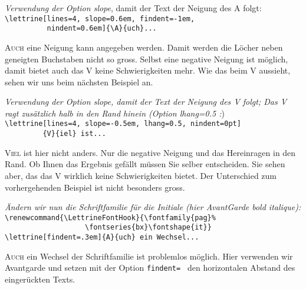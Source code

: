 \documentclass[12pt,a4paper]{article}
\begin{document}
\vspace{.5\baselineskip}
\textit{Verwendung der Option {\ttfamily\upshape slope}}, damit der Text
der Neigung des {\glqq}A{\grqq} folgt:\\
\verb+\lettrine[lines=4, slope=0.6em, findent=-1em,+\\
\verb+          nindent=0.6em]{\A}{uch}...+

\lettrine[lines=4, slope=0.6em, findent=-1em, nindent=0.6em]{A}{uch} eine
Neigung kann angegeben werden. Damit werden die L\"ocher neben geneigten
Buchstaben nicht so gross. Selbst eine negative Neigung ist m\"oglich, damit
bietet auch das {\glqq}V{\grqq} keine Schwierigkeiten mehr. Wie das beim
{\glqq}V{\grqq} aussieht, sehen wir uns beim n\"achsten Beispiel an.

\vspace{.5\baselineskip}
\textit{Verwendung der Option {\ttfamily\upshape slope}, damit der Text
der Neigung des {\ttfamily\upshape V} folgt; Das {\ttfamily\upshape V} ragt
zus\"atzlich halb in den Rand hinein
(Option {\ttfamily\upshape lhang=0.5} :})\\
\verb+\lettrine[lines=4, slope=-0.5em, lhang=0.5, nindent=0pt]+\\
\verb+         {V}{iel} ist...+

\lettrine[lines=4, slope=-0.5em, lhang=0.5, nindent=0pt]{V}{iel} ist hier
nicht anders. Nur die negative Neigung und das Hereinragen in den Rand. Ob
Ihnen das Ergebnis gef\"allt m\"ussen Sie selber entscheiden.  Sie sehen aber,
das das {\glqq}V{\grqq} wirklich keine Schwierigkeiten bietet. Der Unterschied
zum vorhergehenden Beispiel ist nicht besonders gross.

\vspace{.5\baselineskip}
\textit{\"Andern wir nun die Schriftfamilie f\"ur die Initiale
(hier AvantGarde bold italique):}\\
\verb+\renewcommand{\LettrineFontHook}{\fontfamily{pag}%+\\
\verb+                   \fontseries{bx}\fontshape{it}}+\\
\verb+\lettrine[findent=.3em]{A}{uch} ein Wechsel...+

{%
\renewcommand{\LettrineFontHook}{\fontfamily{pag}\fontseries{bx}\fontshape{it}}

\lettrine[findent=.3em]{A}{uch} ein Wechsel der Schriftfamilie ist problemlos
m\"oglich. Hier verwenden wir Avantgarde und setzen mit der Option
\verb+findent= + den horizontalen Abstand des einger\"uckten Texts.
\par}
\end{document}
